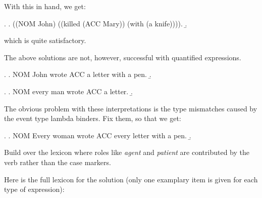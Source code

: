 \documentclass[10pt,a4paper]{exam}
\begin{document}
With this in hand, we get:

\ex.
\a. ((NOM John) ((killed (ACC Mary)) (with (a knife)))).
\b. 

which is quite satisfactory.

\begin{questions}
\question[30] The above solutions are not, however, successful with quantified expressions.

\ex.
\a. NOM John wrote ACC a letter with a pen.
\b. 


\ex.
\a. NOM every man wrote ACC a letter.
\b. 


The obvious problem with these interpretations is the type mismatches caused by the event type lambda binders. Fix them, so that we get:


\ex.\label{probex}
\a.\label{probexEx} NOM Every woman wrote ACC every letter with a pen.
\b.\label{probexInt}


Build over the lexicon where roles like \emph{agent} and \emph{patient} are contributed by the verb rather than the case markers.


\begin{solution}
Here is the full lexicon for the solution (only one examplary item is
given for each type of expression):

\begin{ulexicon}


\end{ulexicon}
\end{solution}
\end{questions}
\end{document}
